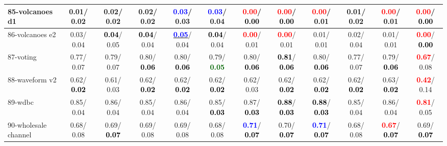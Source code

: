 \begin{table}[h]
\begin{center}
{\begin{tabular}{lc|c|c|c|c|c|c|c|c|c|c}
85-volcanoes d1 &   0.01/  0.02 &   0.02/  0.02 &   0.02/  0.02 & \textcolor{blue}{\textbf{  0.03}}/  0.03 & \textcolor{blue}{\textbf{  0.03}}/  0.04 & \textcolor{red}{\textbf{  0.00}}/\textcolor{black}{\textbf{  0.00}} & \textcolor{red}{\textbf{  0.00}}/\textcolor{black}{\textbf{  0.00}} & \textcolor{red}{\textbf{  0.00}}/  0.01 &   0.01/  0.02 & \textcolor{red}{\textbf{  0.00}}/  0.01 & \textcolor{red}{\textbf{  0.00}}/\textcolor{black}{\textbf{  0.00}} \\ \hline
86-volcanoes e2 &   0.03/  0.04 & \textcolor{black}{\textbf{  0.04}}/  0.05 & \textcolor{black}{\textbf{  0.04}}/  0.04 & \underline{\textcolor{blue}{\textbf{  0.05}}}/  0.04 & \textcolor{black}{\textbf{  0.04}}/  0.04 & \textcolor{red}{\textbf{  0.00}}/  0.01 & \textcolor{red}{\textbf{  0.00}}/  0.01 &   0.01/  0.01 &   0.02/  0.04 &   0.01/  0.01 & \textcolor{red}{\textbf{  0.00}}/\textcolor{black}{\textbf{  0.00}} \\
87-voting &   0.77/  0.07 &   0.79/  0.07 &   0.80/\textcolor{black}{\textbf{  0.06}} &   0.80/\textcolor{black}{\textbf{  0.06}} &   0.79/\textcolor{darkgreen}{\textbf{  0.05}} &   0.80/\textcolor{black}{\textbf{  0.06}} & \textcolor{black}{\textbf{  0.81}}/\textcolor{black}{\textbf{  0.06}} &   0.80/\textcolor{black}{\textbf{  0.06}} &   0.77/  0.07 &   0.79/\textcolor{black}{\textbf{  0.06}} & \textcolor{red}{\textbf{  0.67}}/  0.08 \\
88-waveform v2 &   0.62/\textcolor{black}{\textbf{  0.02}} &   0.61/  0.03 &   0.62/\textcolor{black}{\textbf{  0.02}} &   0.62/\textcolor{black}{\textbf{  0.02}} &   0.62/\textcolor{black}{\textbf{  0.02}} &   0.62/  0.03 &   0.62/\textcolor{black}{\textbf{  0.02}} &   0.62/\textcolor{black}{\textbf{  0.02}} &   0.62/\textcolor{black}{\textbf{  0.02}} &   0.63/\textcolor{black}{\textbf{  0.02}} & \textcolor{red}{\textbf{  0.42}}/  0.14 \\
89-wdbc &   0.85/  0.04 &   0.86/  0.04 &   0.85/  0.04 &   0.86/  0.04 &   0.85/\textcolor{black}{\textbf{  0.03}} &   0.87/\textcolor{black}{\textbf{  0.03}} & \textcolor{black}{\textbf{  0.88}}/\textcolor{black}{\textbf{  0.03}} & \textcolor{black}{\textbf{  0.88}}/\textcolor{black}{\textbf{  0.03}} &   0.85/  0.04 &   0.86/  0.04 & \textcolor{red}{\textbf{  0.81}}/  0.05 \\
90-wholesale channel &   0.68/  0.08 &   0.69/\textcolor{black}{\textbf{  0.07}} &   0.69/  0.08 &   0.69/  0.08 &   0.68/  0.08 & \textcolor{blue}{\textbf{  0.71}}/\textcolor{black}{\textbf{  0.07}} &   0.70/\textcolor{black}{\textbf{  0.07}} & \textcolor{blue}{\textbf{  0.71}}/\textcolor{black}{\textbf{  0.07}} &   0.68/  0.08 & \textcolor{red}{\textbf{  0.67}}/\textcolor{black}{\textbf{  0.07}} &   0.69/\textcolor{black}{\textbf{  0.07}} \\

\end{tabular}}
\end{center}
\end{table}
